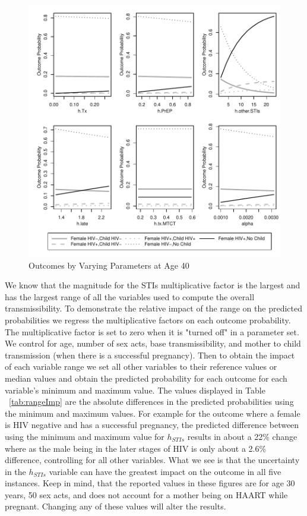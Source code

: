 \documentclass[11pt]{nih_mod}
\begin{document}
\begin{figure}[H]
  \begin{center}
    \includegraphics[width=7in]{figures/OnlyVaryParam_Age40_06Sept2012.pdf}
  \end{center}
  \caption{Outcomes by Varying Parameters at Age 40}
  \label{Fig:Vary40}
\end{figure}

We know that the magnitude for the STIs multiplicative factor is the largest and has the largest range of all the variables used to compute the overall transmissibility.  To demonstrate the relative impact of the range on the predicted probabilities we regress the multiplicative factors on each outcome probability.  The multiplicative factor is set to zero when it is "turned off" in a parameter set.  We control for age, number of sex acts, base transmissibility, and mother to child transmission (when there is a successful pregnancy).  Then to obtain the impact of each variable range we set all other variables to their reference values or median values and obtain the predicted probability for each outcome for each variable's minimum and maximum value.  The values displayed in Table ~\ref{tab:rangeImp} are the absolute differences in the predicted probabilities using the minimum and maximum values.  For example for the outcome where a female is HIV negative and has a successful pregnancy, the predicted difference between using the minimum and maximum value for $h_{STIs}$ results in about a 22\% change where as the male being in the later stages of HIV is only about a 2.6\% difference, controlling for all other variables.   What we see is that the uncertainty in the $h_{STIs}$ variable can have the greatest impact on the outcome in all five instances.  Keep in mind, that the reported values in these figures are for age 30 years, 50 sex acts, and does not account for a mother being on HAART while pregnant.  Changing any of these values will alter the results.
\end{document}
